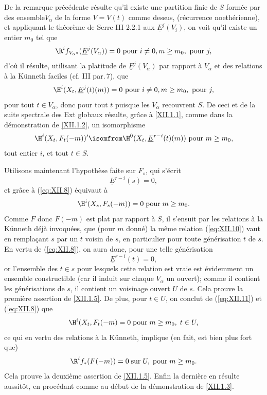 De la remarque pr\'ec\'edente r\'esulte qu'il existe une partition finie de $S$ form\'ee par des ensemble$V_\alpha$ de la forme $V=V(t)$ comme dessus, (r\'ecurrence noeth\'erienne), et appliquant le th\'eor\`eme de Serre \EGA III 2.2.1 aux $\underline{E}^j(V_i)$, on voit qu'il existe un entier $m_0$ tel que
\[
\R^if_{V_\alpha\ast}(\underline{E}^j(V_\alpha))=0\textup{ pour } i\neq 0, m\geq m_0, \textup{ pour }j,
\]
d'o\`u il r\'esulte, utilisant la platitude de $\underline{E}^j(V_\alpha)$ par rapport \`a $V_\alpha$ et des relations \`a la Künneth faciles (cf. \EGA III par.\,7), que
\[
\H^i(X_t, \underline{E}^j(t)(m))=0\textup{ pour } i\neq 0, m\geq m_0, \textup{ pour }j,
\]
pour tout $t\in V_\alpha$, donc pour tout $t$ puisque les $ V_\alpha$ recouvrent $S$. De ceci et de la suite spectrale des Ext globaux r\'esulte, gr\^ace \`a \ref{XII.1.1}, comme dans la d\'emonstration de \ref{XII.1.2}, un isomorphisme
\steco
\begin{equation} \label{eq:XII.8} {}\H^i(X_t, F_t(-m))' \isomfrom \H^0(X_t, \underline{E}^{r-i}(t)(m))\textup{ pour } m\geq m_0,
\end{equation}
tout entier $i$, et tout $t\in S$.

Utilisons maintenant l'hypoth\`ese faite sur $F_s$, qui s'\'ecrit
\steco
\begin{equation} \label{eq:XII.9} {}\underline{E}^{r-i}(s)=0,
\end{equation}
et gr\^ace \`a (\ref{eq:XII.8}) \'equivaut \`a
\steco
\begin{equation} \label{eq:XII.10} {}\H^i(X_s, F_s(-m))=0 \; \text{pour}\; m\geq m_0.
\end{equation}
Comme $F$ donc $F(-m)$ est plat par rapport \`a $S$, il s'ensuit par
les relations \`a la Künneth d\'ej\`a invoqu\'ees, que (pour $m$ donn\'e) la
m\^eme relation (\ref{eq:XII.10}) vaut en rempla\c cant $s$ par un
$t$ voisin de $s$, en particulier pour toute g\'en\'erisation $t$ de
$s$. En vertu de (\ref{eq:XII.8}), on aura donc, pour une telle
g\'en\'erisation \steco
\begin{equation} \label{eq:XII.11} {}\underline{E}^{r-i}(t)=0,
\end{equation}
or l'ensemble des $t\in s$ pour lesquels cette relation est vraie est \'evidemment un ensemble constructible (car il induit sur chaque $V_\alpha$ un ouvert); comme il contient les g\'en\'erisations de $s$, il contient un voisinage ouvert $U$ de $s$. Cela prouve la premi\`ere assertion de \ref{XII.1.5}. De plus, pour $t\in U$, on conclut de (\ref{eq:XII.11}) et (\ref{eq:XII.8}) que
\steco
\begin{equation} \label{eq:XII.12} {}\H^i(X_t, F_t(-m)=0 \; \text{pour}\; m\geq m_0, \; t\in U,
\end{equation}
ce qui en vertu des relations \`a la Künneth, implique (en fait, est bien plus fort que)
\steco
\begin{equation} \label{eq:XII.13} {}\R^if_\ast(F(-m))=0 \; \text{sur}\; U, \; \text{pour} \; m\geq m_0.
\end{equation}
Cela prouve la deuxi\`eme assertion de \ref{XII.1.5}. Enfin la derni\`ere en r\'esulte aussit\^{o}t, en proc\'edant comme au d\'ebut de la d\'emonstration de \ref{XII.1.3}.

